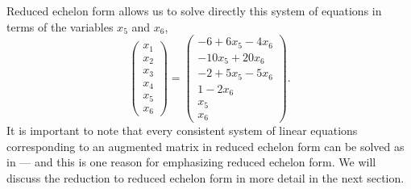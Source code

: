 \documentclass{ximera}
\begin{document}
Reduced echelon form allows us to solve directly this system of
equations in terms of the variables $x_5$ and $x_6$,
\begin{equation}  \label{e:refexamp6}
\left(\begin{array}{c} x_1\\x_2\\x_3\\x_4\\x_5\\x_6\end{array}\right) =
\left(\begin{array}{c} -6+6x_5-4x_6\\-10x_5+20x_6\\
-2+5x_5-5x_6\\1-2x_6\\x_5\\x_6\end{array}\right).
\end{equation}
It is important to note that every consistent system of linear equations
corresponding to an augmented matrix in reduced echelon form can be
solved as in  --- and this is one reason for emphasizing
reduced echelon form.  We will discuss the reduction to reduced echelon
form in more detail in the next section.

\EXER


\TEXER
\end{document}
